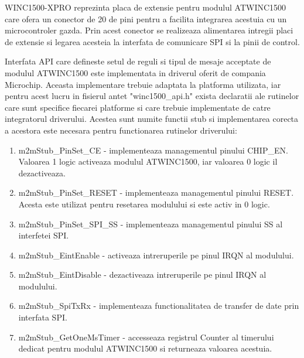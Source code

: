 WINC1500-XPRO reprezinta placa de extensie pentru modulul ATWINC1500 care ofera un conector de 20 de pini pentru a facilita integrarea acestuia cu un microcontroler 
gazda. Prin acest conector se realizeaza alimentarea intregii placi de extensie si legarea acesteia la interfata de comunicare SPI si la pinii de control.

Interfata API care defineste setul de reguli si tipul de mesaje acceptate de modulul ATWINC1500 este implementata in driverul oferit de compania Microchip. Aceasta 
implementare trebuie adaptata la platforma utilizata, iar pentru acest lucru in fisierul antet "winc1500\_api.h" exista declaratii ale rutinelor care sunt specifice 
fiecarei platforme si care trebuie implementate de catre integratorul driverului. Acestea sunt numite functii stub si implementarea corecta a acestora este necesara 
pentru functionarea rutinelor driverului:
\begin{enumerate}
	\item m2mStub\_PinSet\_CE - implementeaza managementul pinului CHIP\_EN. Valoarea 1 logic activeaza modulul ATWINC1500, iar valoarea 0 logic il dezactiveaza.
	\item m2mStub\_PinSet\_RESET - implementeaza managementul pinului RESET. Acesta este utilizat pentru resetarea modulului si este activ in 0 logic.
	\item m2mStub\_PinSet\_SPI\_SS - implementeaza managementul pinului SS al interfetei SPI. 
	\item m2mStub\_EintEnable - activeaza intreruperile pe pinul IRQN al modulului.
	\item m2mStub\_EintDisable - dezactiveaza intreruperile pe pinul IRQN al modulului.
	\item m2mStub\_SpiTxRx - implementeaza functionalitatea de transfer de date prin interfata SPI.
	\item m2mStub\_GetOneMsTimer - accesseaza registrul Counter al timerului dedicat pentru modulul ATWINC1500 si returneaza valoarea acestuia.
\end{enumerate}

\

